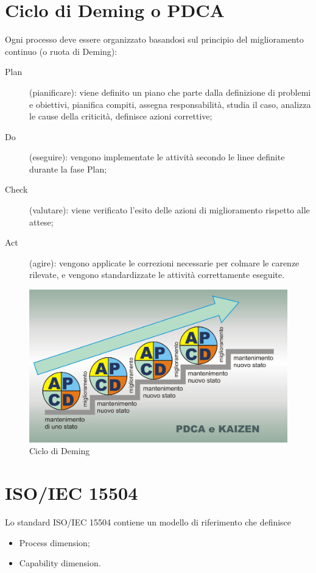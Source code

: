 \documentclass[PianoDiQualifica.tex]{subfiles}
\begin{document}
\begin{appendices}

\chapter{Ciclo di Deming o PDCA}
Ogni processo deve essere organizzato basandosi sul principio del miglioramento continuo (o ruota di Deming):
\begin{description}
	\item [Plan] (pianificare): viene definito un piano che parte dalla definizione di problemi e obiettivi, pianifica compiti, assegna responsabilità, studia il caso, analizza le cause della criticità, definisce azioni correttive; 
	\item [Do](eseguire): vengono implementate le attività secondo le linee definite durante la fase Plan;
	\item [Check] (valutare): viene verificato l'esito delle azioni di miglioramento rispetto alle attese;
	\item [Act] (agire): vengono applicate le correzioni necessarie per colmare le carenze rilevate, e vengono standardizzate le attività correttamente eseguite.
\end{description}

\begin{figure}[htbp]
	\begin{center}
		\includegraphics[width=0.7\linewidth]{PDCAkaizen}
		\caption[Ciclo di Deming]{Ciclo di Deming}
		\label{fig:pdca}
	\end{center}
\end{figure}

\chapter{ISO/IEC 15504}
Lo standard ISO/IEC 15504 contiene un modello di riferimento che definisce 
\begin{itemize}
	\item Process dimension;
	\item Capability dimension.
\end{itemize}


\end{appendices}
\end{document}
